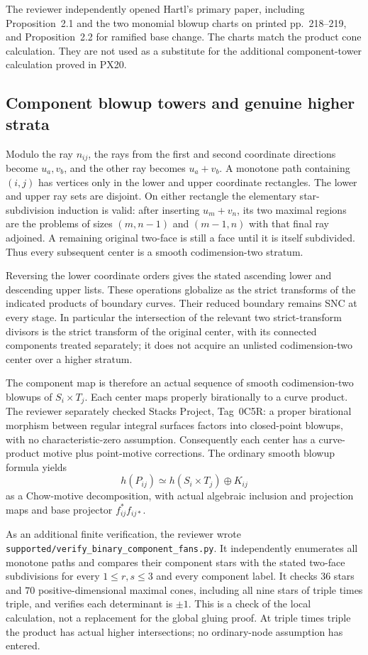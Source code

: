 The reviewer independently opened Hartl's primary paper, including
Proposition~2.1 and the two monomial blowup charts on printed
pp.~218--219, and Proposition~2.2 for ramified base change. The charts
match the product cone calculation. They are not used as a substitute
for the additional component-tower calculation proved in PX20.

\subsection{Component blowup towers and genuine higher strata}

Modulo the ray $n_{ij}$, the rays from the first and second coordinate
directions become $u_a,v_b$, and the other ray becomes $u_a+v_b$.
A monotone path containing $(i,j)$ has vertices only in the lower and
upper coordinate rectangles. The lower and upper ray sets are
disjoint. On either rectangle the elementary star-subdivision
induction is valid: after inserting $u_m+v_n$, its two maximal regions
are the problems of sizes $(m,n-1)$ and $(m-1,n)$ with that final ray
adjoined. A remaining original two-face is still a face until it is
itself subdivided. Thus every subsequent center is a smooth
codimension-two stratum.

Reversing the lower coordinate orders gives the stated ascending lower
and descending upper lists. These operations globalize as the strict
transforms of the indicated products of boundary curves. Their
reduced boundary remains SNC at every stage. In particular the
intersection of the relevant two strict-transform divisors is the
strict transform of the original center, with its connected components
treated separately; it does not acquire an unlisted codimension-two
center over a higher stratum.

The component map is therefore an actual sequence of smooth
codimension-two blowups of $S_i\times T_j$. Each center maps properly
birationally to a curve product. The reviewer separately checked
Stacks Project, Tag~0C5R: a proper birational morphism between regular
integral surfaces factors into closed-point blowups, with no
characteristic-zero assumption. Consequently each center has a
curve-product motive plus point-motive corrections. The ordinary
smooth blowup formula yields
\[
 h(P_{ij})\simeq h(S_i\times T_j)\oplus K_{ij}
\]
as a Chow-motive decomposition, with actual algebraic inclusion and
projection maps and base projector $f_{ij}^*f_{ij*}$.

As an additional finite verification, the reviewer wrote
\texttt{supported/verify\_binary\_component\_fans.py}. It independently
enumerates all monotone paths and compares their component stars
with the stated two-face subdivisions for every $1\le r,s\le3$ and
every component label. It checks $36$ stars and $70$
positive-dimensional maximal cones, including all nine stars of
triple times triple, and verifies each determinant is $\pm1$.
This is a check of the local calculation, not a replacement for the
global gluing proof. At triple times triple the product has actual
higher intersections; no ordinary-node assumption has entered.

